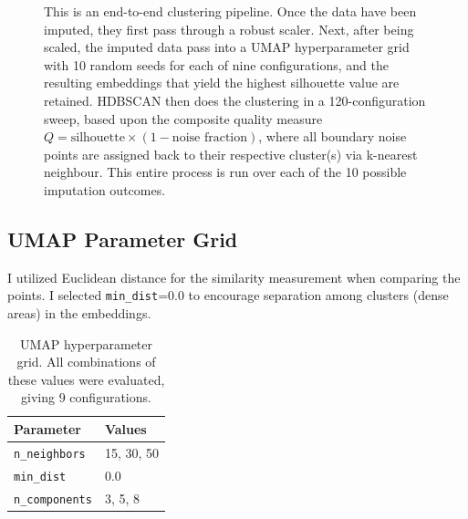\begin{figure}[htbp]
\centering
{}
\caption[Pipeline overview]{This is an end-to-end clustering pipeline. Once the data have been imputed, they first pass through a robust scaler. Next, after being scaled, the imputed data pass into a UMAP hyperparameter grid with 10 random seeds for each of nine configurations, and the resulting embeddings that yield the highest silhouette value are retained. HDBSCAN then does the clustering in a 120-configuration sweep, based upon the composite quality measure $Q = \text{silhouette} \times (1 - \text{noise fraction})$, where all boundary noise points are assigned back to their respective cluster(s) via k-nearest neighbour. This entire process is run over each of the 10 possible imputation outcomes.}
\label{fig:pipeline_diagram}
\end{figure}

\subsection{UMAP Parameter Grid}
I utilized Euclidean distance for the similarity measurement when comparing the points. I selected \texttt{min\_dist}=0.0 to encourage separation among clusters (dense areas) in the embeddings.

\begin{table}[ht]
\caption{UMAP hyperparameter grid. All combinations of these values were evaluated, giving 9 configurations.}
\label{tab:umap_grid}
\centering
\begin{tabular}{l l}
\toprule
\textbf{Parameter} & \textbf{Values} \\
\midrule
\texttt{n\_neighbors}  & 15, 30, 50 \\
\texttt{min\_dist}     & 0.0 \\
\texttt{n\_components} & 3, 5, 8 \\
\bottomrule
\end{tabular}
\end{table}

